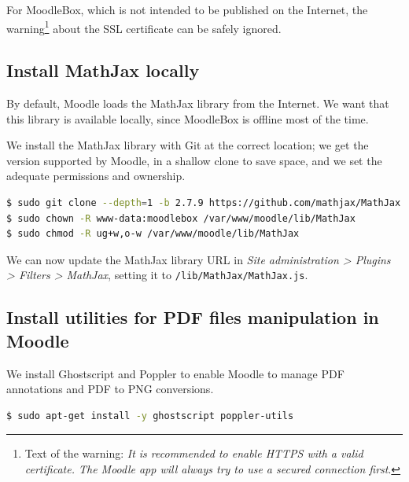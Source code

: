 \documentclass[12pt]{article}
\begin{document}
For MoodleBox, which is not intended to be published on the Internet, the warning\footnote{Text of the warning: \textsl{It is recommended to enable HTTPS with a valid certificate. The Moodle app will always try to use a secured connection first}.} about the SSL certificate can be safely ignored.

\subsection{Install MathJax locally}

By default, Moodle loads the MathJax library from the Internet.
We want that this library is available locally, since MoodleBox is offline most of the time.

We install the MathJax library with Git at the correct location; we get the version supported by Moodle, in a shallow clone to save space, and we set the adequate permissions and ownership.
\begin{lstlisting}[language=bash]
$ sudo git clone --depth=1 -b 2.7.9 https://github.com/mathjax/MathJax.git /var/www/moodle/lib/MathJax
$ sudo chown -R www-data:moodlebox /var/www/moodle/lib/MathJax
$ sudo chmod -R ug+w,o-w /var/www/moodle/lib/MathJax
\end{lstlisting}

We can now update the MathJax library URL in \emph{Site administration > Plugins > Filters > MathJax}, setting it to \lstinline{/lib/MathJax/MathJax.js}.

\subsection{Install utilities for PDF files manipulation in Moodle}

We install Ghostscript and Poppler to enable Moodle to manage PDF annotations and PDF to PNG conversions.
\begin{lstlisting}[language=bash]
$ sudo apt-get install -y ghostscript poppler-utils
\end{lstlisting}
\end{document}
